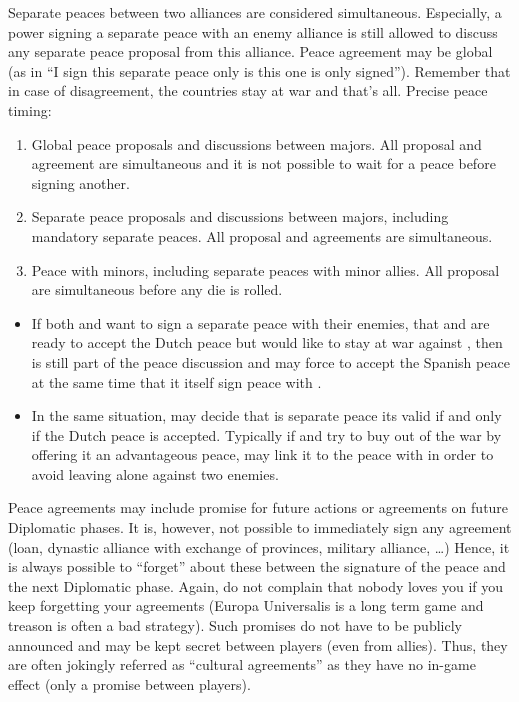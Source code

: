 Separate peaces between two alliances are considered simultaneous. Especially,
a power signing a separate peace with an enemy alliance is still allowed to
discuss any separate peace proposal from this alliance. Peace agreement may be
global (as in ``I sign this separate peace only is this one is only
signed''). Remember that in case of disagreement, the countries stay at war
and that's all.
\bparag Precise peace timing:
\begin{enumerate}
\item Global peace proposals and discussions between majors. All proposal and
  agreement are simultaneous and it is not possible to wait for a peace before
  signing another.
\item Separate peace proposals and discussions between majors, including
  mandatory separate peaces. All proposal and agreements are simultaneous.
\item Peace with minors, including separate peaces with minor allies. All
  proposal are simultaneous before any die is rolled.
\end{enumerate}

\begin{exemple}[Continued]
  \begin{itemize}
  \item If both \HOL and \HIS want to sign a separate peace with their
    enemies, that \FRA and \HIS are ready to accept the Dutch peace but \ANG
    would like to stay at war against \HIS, then \HOL is still part of the
    peace discussion and may force \ANG to accept the Spanish peace at the
    same time that it itself sign peace with \FRA.
  \item In the same situation, \HIS may decide that is separate peace its
    valid if and only if the Dutch peace is accepted. Typically if \ANG and
    \HOL try to buy \HIS out of the war by offering it an advantageous peace,
    \HIS may link it to the peace with \HOL in order to avoid leaving \FRA
    alone against two enemies.
  \end{itemize}
\end{exemple}

\bparag Peace agreements may include promise for future actions or agreements
on future Diplomatic phases.
\bparag It is, however, not possible to immediately sign any agreement (loan,
dynastic alliance with exchange of provinces, military alliance, \ldots)
Hence, it is always possible to ``forget'' about these between the signature
of the peace and the next Diplomatic phase. Again, do not complain that nobody
loves you if you keep forgetting your agreements (Europa Universalis is a long
term game and treason is often a bad strategy).
\bparag Such promises do not have to be publicly announced and may be kept
secret between players (even from allies). Thus, they are often jokingly
referred as ``cultural agreements'' as they have no in-game effect (only a
promise between players).

